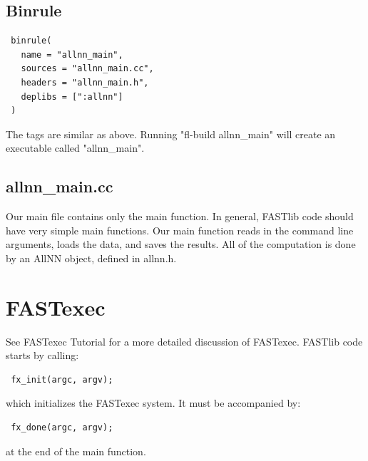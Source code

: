\documentclass[letter]{report}
\begin{document}
\subsection{Binrule}

\begin{verbatim} 
 binrule(
   name = "allnn_main",
   sources = "allnn_main.cc",
   headers = "allnn_main.h",
   deplibs = [":allnn"]
 )
\end{verbatim}
The tags are similar as above. Running "fl-build allnn\_main" will create an executable called "allnn\_main". 

\subsection{allnn\_main.cc} 
Our main file contains only the main function. In general, FASTlib code should have very simple main functions. Our main function reads in the command line arguments, loads the data, and saves the results. All of the computation is done by an AllNN object, defined in allnn.h. 

\section{FASTexec} 
See FASTexec Tutorial for a more detailed discussion of FASTexec. 
FASTlib code starts by calling: 

\begin {verbatim} fx_init(argc, argv);\end{verbatim}
which initializes the FASTexec system. It must be accompanied by: 

\begin{verbatim} fx_done(argc, argv);\end{verbatim}
at the end of the main function. 
\end{document}

